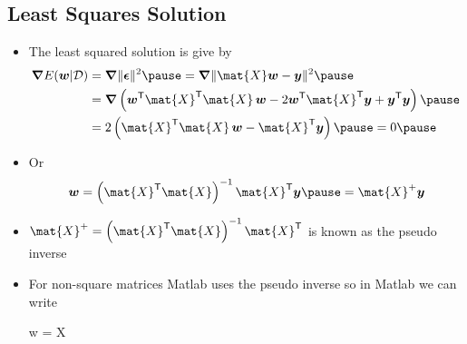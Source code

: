 \documentclass[25pt,landscape,footrule]{foils}
\begin{document}

\begin{slide}
\section[-2]{Least Squares Solution}

\begin{PauseHighLight}

\begin{itemize}\squeeze
\item The least squared solution is give by
  \begin{align*}
    \grad E(\bm{w}|\mathcal{D}) &= \grad \|\bm{\epsilon}\|^2 \pause
    = \grad \| \mat{X} \bm{w} - \bm{y}\|^2 \pause \\
    &= \grad \left(\bm{w}^\tr
      \mat{X}^\tr\mat{X} \, \bm{w} -  2 \bm{w}^\tr\mat{X}^\tr \bm{y} +
      \bm{y}^\tr  \bm{y}\right)\pause\\
    &= 2 \left( \mat{X}^\tr\mat{X}\, \bm{w} - \mat{X}^\tr
      \bm{y}\right)\pause = 0 \pause
  \end{align*}
\item Or
  \begin{displaymath}
    \bm{w} = \left(\mat{X}^\tr\mat{X}\right)^{-1} \mat{X}^\tr \bm{y}\pause
    = \mat{X}^{+} \bm{y}
  \end{displaymath}
\item $\mat{X}^{+} = \left(\mat{X}^\tr\mat{X}\right)^{-1} \mat{X}^\tr$ is
  known as the pseudo inverse\pause
\item For non-square matrices Matlab uses the pseudo inverse so in
  Matlab we can write
  \begin{matlab}
    w = X\y
  \end{matlab}\pause
\end{itemize}

\end{PauseHighLight}
\end{slide}


\Outline %
\end{document}
